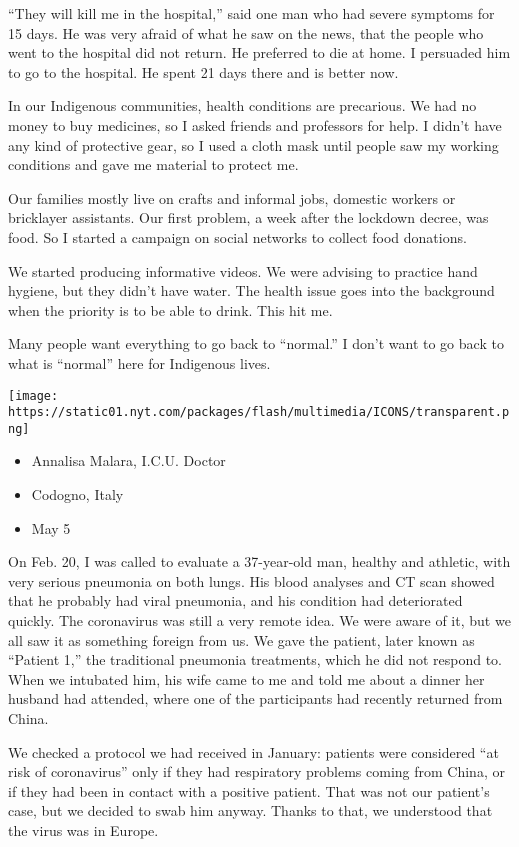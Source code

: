 ``They will kill me in the hospital,'' said one man who had severe
symptoms for 15 days. He was very afraid of what he saw on the news,
that the people who went to the hospital did not return. He preferred to
die at home. I persuaded him to go to the hospital. He spent 21 days
there and is better now.

In our Indigenous communities, health conditions are precarious. We had
no money to buy medicines, so I asked friends and professors for help. I
didn't have any kind of protective gear, so I used a cloth mask until
people saw my working conditions and gave me material to protect me.

Our families mostly live on crafts and informal jobs, domestic workers
or bricklayer assistants. Our first problem, a week after the lockdown
decree, was food. So I started a campaign on social networks to collect
food donations.

We started producing informative videos. We were advising to practice
hand hygiene, but they didn't have water. The health issue goes into the
background when the priority is to be able to drink. This hit me.

Many people want everything to go back to ``normal.'' I don't want to go
back to what is ``normal'' here for Indigenous lives.

\texttt{[image: https://static01.nyt.com/packages/flash/multimedia/ICONS/transparent.png]}

\begin{itemize}
\tightlist
\item
  Annalisa Malara, I.C.U. Doctor
\item
  Codogno, Italy
\item
  May 5
\end{itemize}

On Feb. 20, I was called to evaluate a 37-year-old man, healthy and
athletic, with very serious pneumonia on both lungs. His blood analyses
and CT scan showed that he probably had viral pneumonia, and his
condition had deteriorated quickly. The coronavirus was still a very
remote idea. We were aware of it, but we all saw it as something foreign
from us. We gave the patient, later known as ``Patient 1,'' the
traditional pneumonia treatments, which he did not respond to. When we
intubated him, his wife came to me and told me about a dinner her
husband had attended, where one of the participants had recently
returned from China.

We checked a protocol we had received in January: patients were
considered ``at risk of coronavirus'' only if they had respiratory
problems coming from China, or if they had been in contact with a
positive patient. That was not our patient's case, but we decided to
swab him anyway. Thanks to that, we understood that the virus was in
Europe.

